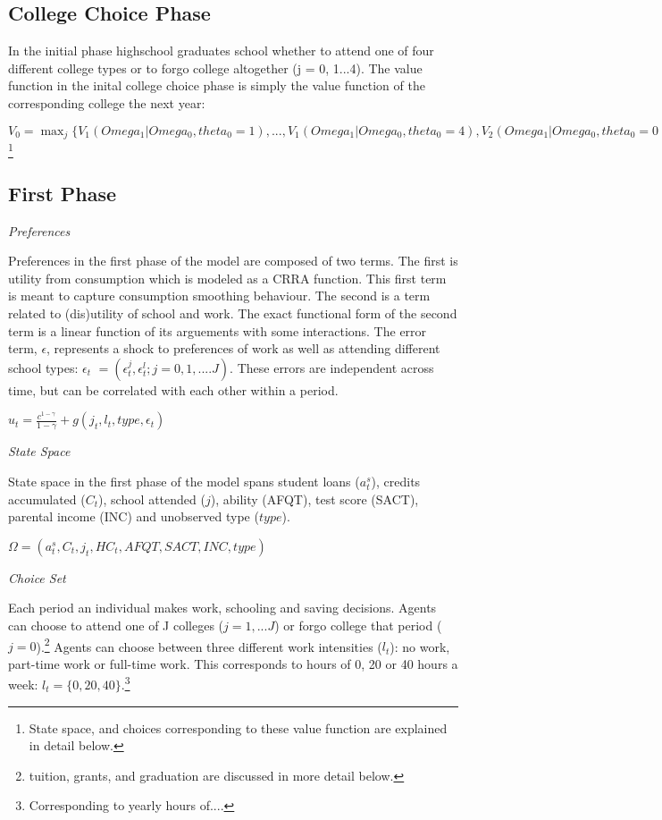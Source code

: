 \documentclass[letterpaper,12pt]{article}
\begin{document}
\subsection{College Choice Phase}

In the initial phase highschool graduates school whether to attend one of four different college types or to forgo college altogether (j = 0, 1...4). The value function in the inital college choice phase is simply the value function of the corresponding college the next year: 

$V_0 = \max_{j} \{V_1(Omega_{1}|Omega_0, theta_0 = 1),...,V_1(Omega_{1}|Omega_0, theta_0 = 4), V_2(Omega_{1}|Omega_0, theta_0 = 0) \}$\footnote{State space, and choices corresponding to these value function are explained in detail below.}

\subsection{First Phase}

\noindent \emph{Preferences}

Preferences in the first phase of the model are composed of two terms. The first is utility from consumption which is modeled as  a CRRA function. This first term is meant to capture consumption smoothing behaviour. The second is a term related to (dis)utility of school and work. The exact functional form of the second term is a linear function of its arguements with some interactions. The error term, $\epsilon$, represents a shock to preferences of work as well as attending different school types: \textbf{$\epsilon_t$} $= (\epsilon^j_t, \epsilon^l_t; j = 0,1,....J)$. These errors are independent across time, but can be correlated with each other within a period. 

$u_t = \frac{c^{1-\gamma}}{1 - \gamma} + g(j_t, l_t, type, \epsilon_t)$

\noindent \emph{State Space}

State space in the first phase of the model spans student loans ($a_t^s$), credits accumulated ($C_t$), school attended ($j$), ability (AFQT), test score (SACT), parental income (INC) and unobserved type ($type$). 

$\Omega = (a_t^{s}, C_t, j_t, HC_t, AFQT, SACT, INC, type)$

\noindent \emph{Choice Set}

Each period an individual makes work, schooling and saving decisions. Agents can choose to attend one of J colleges ($j = 1,...J$) or forgo college that period ($j=0$).\footnote{tuition, grants, and graduation are discussed in more detail below.} Agents can choose between three different work intensities ($l_t$): no work, part-time work or full-time work.  This corresponds to hours of 0, 20 or 40 hours a week: $l_t = \{0, 20, 40 \}$.\footnote{Corresponding to yearly hours of....}
\end{document}
